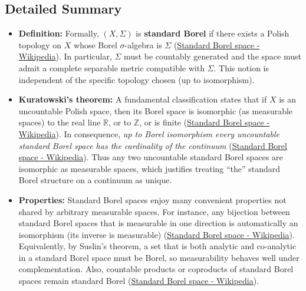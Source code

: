 \documentclass[11pt]{article}
\begin{document}
\subsection{Detailed Summary}
\label{detailed-summary-1}
\begin{itemize}
\item \textbf{Definition:} Formally, \((X,\Sigma)\) is \textbf{standard Borel} if there
exists a Polish topology on \(X\) whose Borel \(\sigma\)-algebra is \(\Sigma\)
(\href{https://en.wikipedia.org/wiki/Standard\_Borel\_space\#:\~:text=A\%20measurable\%20space\%20Image\%3A\%20,algebra.\%5B\%201}{Standard
Borel space - Wikipedia}). In particular, \(\Sigma\) must be
countably generated and the space must admit a complete separable
metric compatible with \(\Sigma\). This notion is independent of the
specific topology chosen (up to isomorphism).

\item \textbf{Kuratowski's theorem:} A fundamental classification states that if
\(X\) is an uncountable Polish space, then its Borel space is
isomorphic (as measurable spaces) to the real line \(\mathbb{R}\), or
to \(\mathbb{Z}\), or is finite
(\href{https://en.wikipedia.org/wiki/Standard\_Borel\_space\#:\~:text=Theorem.\%20Let\%20Image\%3A\%20,is\%20reminiscent\%20of\%20Maharam\%27s\%20theorem}{Standard
Borel space - Wikipedia}). In consequence, \emph{up to Borel isomorphism
every uncountable standard Borel space has the cardinality of the
continuum}
(\href{https://en.wikipedia.org/wiki/Standard\_Borel\_space\#:\~:text=one\%20of\%20\%281\%29\%20Image\%3A\%20,is\%20reminiscent\%20of\%20Maharam\%27s\%20theorem}{Standard
Borel space - Wikipedia}). Thus any two uncountable standard Borel
spaces are isomorphic as measurable spaces, which justifies treating
“the” standard Borel structure on a continuum as unique.

\item \textbf{Properties:} Standard Borel spaces enjoy many convenient properties
not shared by arbitrary measurable spaces. For instance, any bijection
between standard Borel spaces that is measurable in one direction is
automatically an isomorphism (its inverse is measurable)
(\href{https://en.wikipedia.org/wiki/Standard\_Borel\_space\#:\~:text=,are\%20standard\%20Borel\%20spaces\%20and}{Standard
Borel space - Wikipedia}). Equivalently, by Suslin's theorem, a set
that is both analytic and co-analytic in a standard Borel space must
be Borel, so measurability behaves well under complementation. Also,
countable products or coproducts of standard Borel spaces remain
standard Borel
(\href{https://en.wikipedia.org/wiki/Standard\_Borel\_space\#:\~:text=,it\%20into\%20a\%20\%2059}{Standard
Borel space - Wikipedia}).


\end{itemize}
\end{document}

